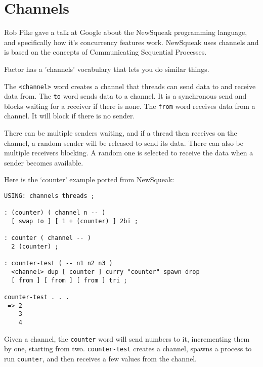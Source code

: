 \chapter{Channels}\label{channels}

Rob Pike gave a talk at Google about the NewSqueak programming
language, and specifically how it's concurrency features
work. NewSqueak uses channels and is based on the concepts of
Communicating Sequential Processes.

Factor has a 'channels' vocabulary that lets you do similar things.


The \texttt{<channel>} word creates a channel that threads can send data to and
receive data from. The \texttt{to} word sends data to a channel. It is a
synchronous send and blocks waiting for a receiver if there is
none. The \texttt{from} word receives data from a channel. It will block if
there is no sender.

There can be multiple senders waiting, and if a thread then receives
on the channel, a random sender will be released to send its
data. There can also be multiple receivers blocking. A random one is
selected to receive the data when a sender becomes available.

Here is the `counter' example ported from NewSqueak:

\begin{verbatim}
USING: channels threads ;

: (counter) ( channel n -- )
  [ swap to ] [ 1 + (counter) ] 2bi ;
    
: counter ( channel -- )
  2 (counter) ;    

: counter-test ( -- n1 n2 n3 )
  <channel> dup [ counter ] curry "counter" spawn drop
  [ from ] [ from ] [ from ] tri ; 

counter-test . . . 
 => 2
    3
    4
\end{verbatim}

Given a channel, the \texttt{counter} word will send numbers to it,
incrementing them by one, starting from two. \texttt{counter-test} creates a
channel, spawns a process to run \texttt{counter}, and then receives a few
values from the channel.

